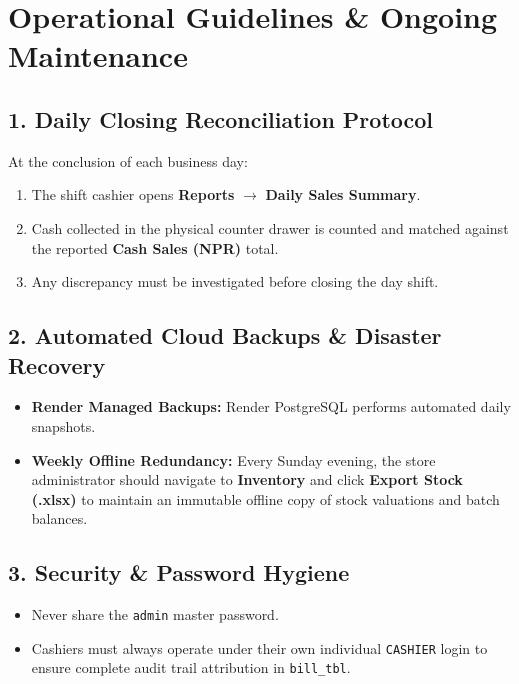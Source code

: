 \documentclass[10pt,a4paper]{article}
\begin{document}
\section{Operational Guidelines \& Ongoing Maintenance}

\subsection{1. Daily Closing Reconciliation Protocol}
At the conclusion of each business day:
\begin{enumerate}
    \item The shift cashier opens \textbf{Reports} $\rightarrow$ \textbf{Daily Sales Summary}.
    \item Cash collected in the physical counter drawer is counted and matched against the reported \textbf{Cash Sales (NPR)} total.
    \item Any discrepancy must be investigated before closing the day shift.
\end{enumerate}

\subsection{2. Automated Cloud Backups \& Disaster Recovery}
\begin{itemize}
    \item \textbf{Render Managed Backups:} Render PostgreSQL performs automated daily snapshots.
    \item \textbf{Weekly Offline Redundancy:} Every Sunday evening, the store administrator should navigate to \textbf{Inventory} and click \textbf{Export Stock (.xlsx)} to maintain an immutable offline copy of stock valuations and batch balances.
\end{itemize}

\subsection{3. Security \& Password Hygiene}
\begin{itemize}
    \item Never share the \texttt{admin} master password.
    \item Cashiers must always operate under their own individual \texttt{CASHIER} login to ensure complete audit trail attribution in \texttt{bill\_tbl}.
\end{itemize}

\end{document}
